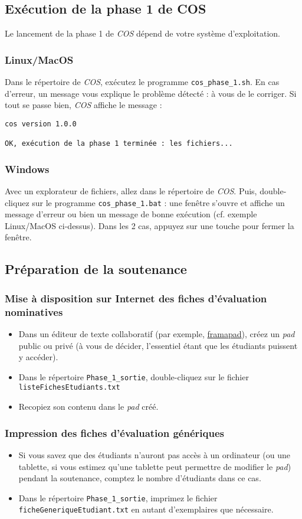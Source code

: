 \documentclass[11pt]{article}
\begin{document}
\subsection{Exécution de la phase 1 de COS}
\label{sec-4-2}
Le lancement de la phase 1 de \emph{COS} dépend de votre système
d'exploitation.
\subsubsection{Linux/MacOS}
\label{sec-4-2-1}
Dans le répertoire de \emph{COS}, exécutez le programme
\verb~cos_phase_1.sh~. En cas d'erreur, un message vous explique le
problème détecté : à vous de le corriger. Si tout se passe bien, \emph{COS}
affiche le message :
\begin{verbatim}
cos version 1.0.0

OK, exécution de la phase 1 terminée : les fichiers...
\end{verbatim}
\subsubsection{Windows}
\label{sec-4-2-2}
Avec un explorateur de fichiers, allez dans le répertoire de
\emph{COS}. Puis, double-cliquez sur le programme \verb~cos_phase_1.bat~ : une
fenêtre s'ouvre et affiche un message d'erreur ou bien un message de
bonne exécution (cf. exemple Linux/MacOS ci-dessus). Dans les 2 cas,
appuyez sur une touche pour fermer la fenêtre.
\subsection{Préparation de la soutenance}
\label{sec-4-3}
\subsubsection{Mise à disposition sur Internet des fiches d'évaluation nominatives}
\label{sec-4-3-1}
\begin{itemize}
\item Dans un éditeur de texte collaboratif (par exemple, \href{https://framapad.org/}{framapad}), créez
un \emph{pad} public ou privé (à vous de décider, l'essentiel étant que
les étudiants puissent y accéder).
\item Dans le répertoire \verb~Phase_1_sortie~, double-cliquez sur le fichier
\verb~listeFichesEtudiants.txt~
\item Recopiez son contenu dans le \emph{pad} créé.
\end{itemize}
\subsubsection{Impression des fiches d'évaluation génériques}
\label{sec-4-3-2}
\begin{itemize}
\item Si vous savez que des étudiants n'auront pas accès à un ordinateur
(ou une tablette, si vous estimez qu'une tablette peut permettre de
modifier le \emph{pad}) pendant la soutenance, comptez le nombre
d'étudiants dans ce cas.
\item Dans le répertoire \verb~Phase_1_sortie~, imprimez le fichier
\verb~ficheGeneriqueEtudiant.txt~ en autant d'exemplaires que nécessaire.
\end{itemize}
\end{document}
